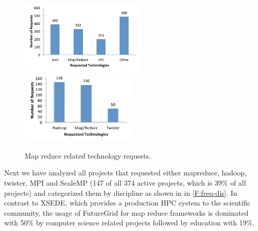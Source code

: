 \documentclass[graybox]{svmult}
\begin{document}
\begin{figure}[htb]
  \centering
    \includegraphics[height=3.5cm]{images/tech-trend-1.pdf}\includegraphics[height=3.5cm]{images/tech-trend-2.pdf}
  \caption{Map reduce related technology requests.}
\label{F:reduce-breakdown}
\end{figure}







Next we have analyzed all projects that requested either mapreduce, hadoop, twister, MPI and ScaleMP (147 of all 374 active projects, which is 39\% of all projects) and categorized them by discipline as shown in in \ref{F:freq-dis}. In contrast to XSEDE, which provides a production HPC system to the scientific community, the usage of FutureGrid for map reduce frameworks is dominated with 50\% by computer science related projects followed by education with 19\%.
\end{document}
